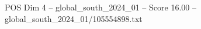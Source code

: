 \begin{textsample}{POS Dim 4 – global\_south\_2024\_01 – Score 16.00 – global\_south\_2024\_01/105554898.txt}
\end{textsample}
